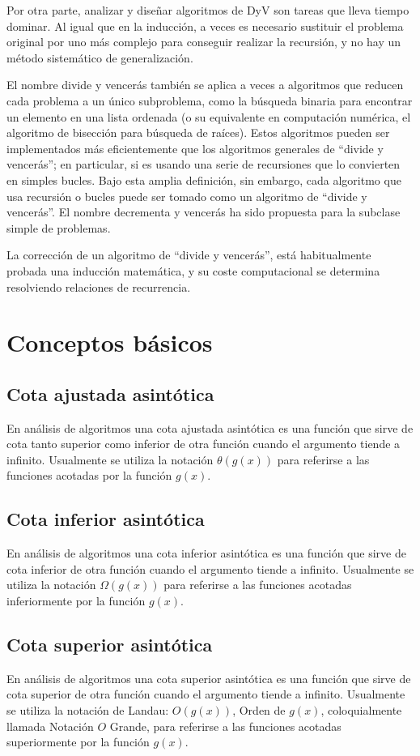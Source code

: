 \documentclass[12pt,twoside]{article}
\begin{document}
Por otra parte, analizar y diseñar algoritmos de DyV son tareas que lleva tiempo dominar. Al igual que en la inducción, a veces es necesario sustituir el problema original por uno más complejo para conseguir realizar la recursión, y no hay un método sistemático de generalización.

El nombre divide y vencerás también se aplica a veces a algoritmos que reducen cada problema a un único subproblema, como la búsqueda binaria para encontrar un elemento en una lista ordenada (o su equivalente en computación numérica, el algoritmo de bisección para búsqueda de raíces). Estos algoritmos pueden ser implementados más eficientemente que los algoritmos generales de “divide y vencerás”; en particular, si es usando una serie de recursiones que lo convierten en simples bucles. Bajo esta amplia definición, sin embargo, cada algoritmo que usa recursión o bucles puede ser tomado como un algoritmo de “divide y vencerás”. El nombre decrementa y vencerás ha sido propuesta para la subclase simple de problemas.

La corrección de un algoritmo de “divide y vencerás”, está habitualmente probada una inducción matemática, y su coste computacional se determina resolviendo relaciones de recurrencia.\cite{al1} 

\section{Conceptos básicos}
\subsection{Cota ajustada asintótica}
En análisis de algoritmos una cota ajustada asintótica es una función que sirve de cota tanto superior como inferior de otra función cuando el argumento tiende a infinito. Usualmente se utiliza la notación $\theta(g(x))$ para referirse a las funciones acotadas por la función $g(x)$.\cite{cota}
\subsection{Cota inferior asintótica}
En análisis de algoritmos una cota inferior asintótica es una función que sirve de cota inferior de otra función cuando el argumento tiende a infinito. Usualmente se utiliza la notación $\Omega(g(x))$ para referirse a las funciones acotadas inferiormente por la función $g(x)$.\cite{cota}

\subsection{Cota superior asintótica}
En análisis de algoritmos una cota superior asintótica es una función que sirve de cota superior de otra función cuando el argumento tiende a infinito. Usualmente se utiliza la notación de Landau: $O(g(x))$, Orden de $g(x)$, coloquialmente llamada Notación $O$ Grande, para referirse a las funciones acotadas superiormente por la función $g(x)$.\cite{cota}
\end{document}
